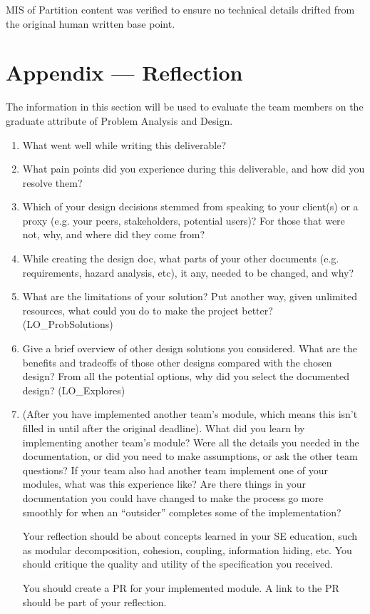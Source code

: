 \documentclass[12pt, titlepage]{article}
\begin{document}
MIS of Partition content was verified to ensure no technical details 
drifted from the original human written base point.

\newpage{}

\section{Appendix --- Reflection}

The information in this section will be used to evaluate the team members on the
graduate attribute of Problem Analysis and Design.



\begin{enumerate}
  \item What went well while writing this deliverable? 
  \item What pain points did you experience during this deliverable, and how
    did you resolve them?
  \item Which of your design decisions stemmed from speaking to your client(s)
  or a proxy (e.g. your peers, stakeholders, potential users)? For those that
  were not, why, and where did they come from?
  \item While creating the design doc, what parts of your other documents (e.g.
  requirements, hazard analysis, etc), it any, needed to be changed, and why?
  \item What are the limitations of your solution?  Put another way, given
  unlimited resources, what could you do to make the project better? (LO\_ProbSolutions)
  \item Give a brief overview of other design solutions you considered.  What
  are the benefits and tradeoffs of those other designs compared with the chosen
  design?  From all the potential options, why did you select the documented design?
  (LO\_Explores)
  \item (After you have implemented another team's module, which means this
  isn't filled in until after the original deadline). What did you learn by
  implementing another team's module? Were all the details you needed in the
  documentation, or did you need to make assumptions, or ask the other team
  questions?  If your team also had another team implement one of your modules,
  what was this experience like?  Are there things in your documentation you
  could have changed to make the process go more smoothly for when an
  ``outsider'' completes some of the implementation?

  Your reflection should be about concepts learned in your SE education, such as modular decomposition, cohesion, coupling, information hiding, etc.  You should critique the quality and utility of the specification you received.

  You should create a PR for your implemented module.  A link to the PR should be part of your reflection.

\end{enumerate}
\end{document}
